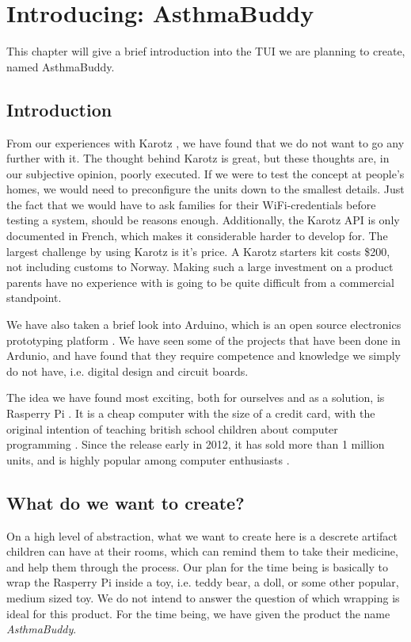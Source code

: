 
\chapter{Introducing: AsthmaBuddy}
\label{chp:our-solution}

This chapter will give a brief introduction into the TUI we are planning to create, named AsthmaBuddy. 

\section{Introduction}
\label{sec:our-solution-introduction}
From our experiences with Karotz \cite{karotz}, we have found that we do not want to go any further with it. The thought behind Karotz is great, but these thoughts are, in our subjective opinion, poorly executed. If we were to test the concept at people's homes, we would need to preconfigure the units down to the smallest details. Just the fact that we would have to ask families for their WiFi-credentials before testing a system, should be reasons enough.
Additionally, the Karotz API is only documented in French, which makes it considerable harder to develop for. The largest challenge by using Karotz is it's price. A Karotz starters kit costs \$200, not including customs to Norway. Making such a large investment on a product parents have no experience with is going to be quite difficult from a commercial standpoint.  



We have also taken a brief look into Arduino, which is an open source electronics prototyping platform \cite{arduino}. We have seen some of the projects that have been done in Ardunio, and have found that they require competence and knowledge we simply do not have, i.e. digital design and circuit boards. 


The idea we have found most exciting, both for ourselves and as a solution, is Rasperry Pi \cite{rasperrypi}. It is a cheap computer with the size of a credit card, with the original intention of teaching british school children about computer programming \cite{rasperrypi-about}. Since the release early in 2012, it has sold more than 1 million units, and is highly popular among computer enthusiasts \cite{pimillion}. 


\section{What do we want to create?}
On a high level of abstraction, what we want to create here is a descrete artifact children can have at their rooms, which can remind them to take their medicine, and help them through the process. Our plan for the time being is basically to wrap the Rasperry Pi inside a toy, i.e. teddy bear, a doll, or some other popular, medium sized toy. We do not intend to answer the question of which wrapping is ideal for this product. For the time being, we have given the product the name \emph{AsthmaBuddy}. 


